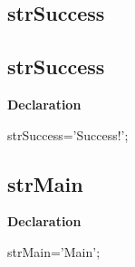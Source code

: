 \documentclass{report}
\newif\ifpdf
\begin{document}
\subsection*{\large{\textbf{strSuccess}}\normalsize\hspace{1ex}\hrulefill}
\else
\subsection*{strSuccess}
\fi
\label{trstrings-strSuccess}
\begin{list}{}{
\setlength{\itemindent}{0cm}
\setlength{\listparindent}{0cm}
\setlength{\leftmargin}{\evensidemargin}
\addtolength{\leftmargin}{\tmplength}
\settowidth{\labelsep}{X}
\addtolength{\leftmargin}{\labelsep}
\setlength{\labelwidth}{\tmplength}
}
\item[\textbf{Declaration}\hfill]
\ifpdf
\begin{flushleft}
\fi
\begin{ttfamily}
strSuccess='Success!';\end{ttfamily}

\ifpdf
\end{flushleft}
\fi

\end{list}
\ifpdf
\subsection*{\large{\textbf{strMain}}\normalsize\hspace{1ex}\hrulefill}
\else
\subsection*{strMain}
\fi
\label{trstrings-strMain}
\begin{list}{}{
\setlength{\itemindent}{0cm}
\setlength{\listparindent}{0cm}
\setlength{\leftmargin}{\evensidemargin}
\addtolength{\leftmargin}{\tmplength}
\settowidth{\labelsep}{X}
\addtolength{\leftmargin}{\labelsep}
\setlength{\labelwidth}{\tmplength}
}
\item[\textbf{Declaration}\hfill]
\ifpdf
\begin{flushleft}
\fi
\begin{ttfamily}
strMain='Main';\end{ttfamily}

\ifpdf
\end{flushleft}
\fi

\end{list}
\ifpdf
\end{document}
